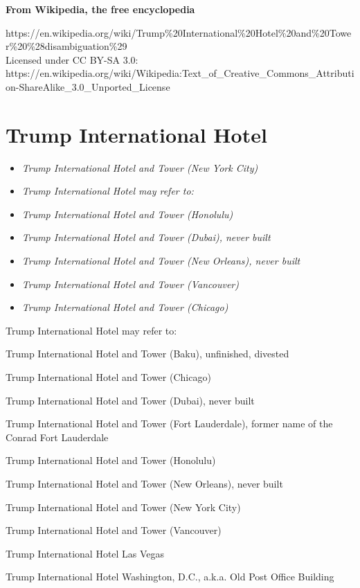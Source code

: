 \textbf{From Wikipedia, the free encyclopedia}

https://en.wikipedia.org/wiki/Trump\%20International\%20Hotel\%20and\%20Tower\%20\%28disambiguation\%29\\
Licensed under CC BY-SA 3.0:\\
https://en.wikipedia.org/wiki/Wikipedia:Text\_of\_Creative\_Commons\_Attribution-ShareAlike\_3.0\_Unported\_License

\section{Trump International Hotel}\label{trump-international-hotel}

\begin{itemize}
\item
  \emph{Trump International Hotel and Tower (New York City)}
\item
  \emph{Trump International Hotel may refer to:}
\item
  \emph{Trump International Hotel and Tower (Honolulu)}
\item
  \emph{Trump International Hotel and Tower (Dubai), never built}
\item
  \emph{Trump International Hotel and Tower (New Orleans), never built}
\item
  \emph{Trump International Hotel and Tower (Vancouver)}
\item
  \emph{Trump International Hotel and Tower (Chicago)}
\end{itemize}

Trump International Hotel may refer to:

Trump International Hotel and Tower (Baku), unfinished, divested

Trump International Hotel and Tower (Chicago)

Trump International Hotel and Tower (Dubai), never built

Trump International Hotel and Tower (Fort Lauderdale), former name of
the Conrad Fort Lauderdale

Trump International Hotel and Tower (Honolulu)

Trump International Hotel and Tower (New Orleans), never built

Trump International Hotel and Tower (New York City)

Trump International Hotel and Tower (Vancouver)

Trump International Hotel Las Vegas

Trump International Hotel Washington, D.C., a.k.a. Old Post Office
Building

